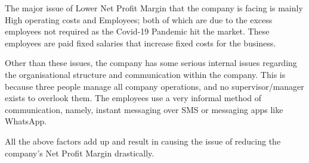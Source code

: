 	{The major issue of Lower Net Profit Margin that the company is facing is mainly High operating costs and Employees; both of which are due to the excess employees not required as the Covid-19 Pandemic hit the market. These employees are paid fixed salaries that increase fixed costs for the business.}
	
	{Other than these issues, the company has some serious internal issues regarding the organisational structure and communication within the company. This is because three people manage all company operations, and no supervisor/manager exists to overlook them. The employees use a very informal method of communication, namely, instant messaging over SMS or messaging apps like WhatsApp.}
	
	{All the above factors add up and result in causing the issue of reducing the company's Net Profit Margin drastically.}



